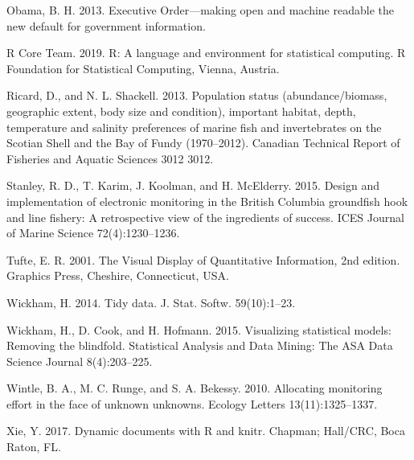 \documentclass[12pt,]{article}
\newenvironment{CSLReferences}%
{\setlength{\parindent}{0pt}%
\everypar{\setlength{\hangindent}{\cslhangindent}}\ignorespaces}%
{\par}
\newlength{\cslhangindent}
\begin{document}
\begin{CSLReferences}
\leavevmode\hypertarget{ref-obama2013}{}%
Obama, B. H. 2013. {Executive Order}---making open and machine readable the new default for government information.

\leavevmode\hypertarget{ref-r2019}{}%
R Core Team. 2019. R: A language and environment for statistical computing. R Foundation for Statistical Computing, Vienna, Austria.

\leavevmode\hypertarget{ref-ricard2013}{}%
Ricard, D., and N. L. Shackell. 2013. Population status (abundance/biomass, geographic extent, body size and condition), important habitat, depth, temperature and salinity preferences of marine fish and invertebrates on the {Scotian Shell} and the {Bay} of {Fundy} (1970--2012). Canadian Technical Report of Fisheries and Aquatic Sciences 3012 3012.

\leavevmode\hypertarget{ref-stanley2015}{}%
Stanley, R. D., T. Karim, J. Koolman, and H. McElderry. 2015. Design and implementation of electronic monitoring in the {British Columbia} groundfish hook and line fishery: A retrospective view of the ingredients of success. ICES Journal of Marine Science 72(4):1230--1236.

\leavevmode\hypertarget{ref-tufte2001}{}%
Tufte, E. R. 2001. {The Visual Display of Quantitative Information}, 2nd edition. Graphics Press, Cheshire, Connecticut, USA.

\leavevmode\hypertarget{ref-wickham2014}{}%
Wickham, H. 2014. Tidy data. J. Stat. Softw. 59(10):1--23.

\leavevmode\hypertarget{ref-wickham2015}{}%
Wickham, H., D. Cook, and H. Hofmann. 2015. Visualizing statistical models: {Removing} the blindfold. Statistical Analysis and Data Mining: The ASA Data Science Journal 8(4):203--225.

\leavevmode\hypertarget{ref-wintle2010}{}%
Wintle, B. A., M. C. Runge, and S. A. Bekessy. 2010. Allocating monitoring effort in the face of unknown unknowns. Ecology Letters 13(11):1325--1337.

\leavevmode\hypertarget{ref-xie2017}{}%
Xie, Y. 2017. Dynamic documents with {R} and knitr. Chapman; Hall/CRC, Boca Raton, FL.

\end{CSLReferences}
%
%
\end{document}
